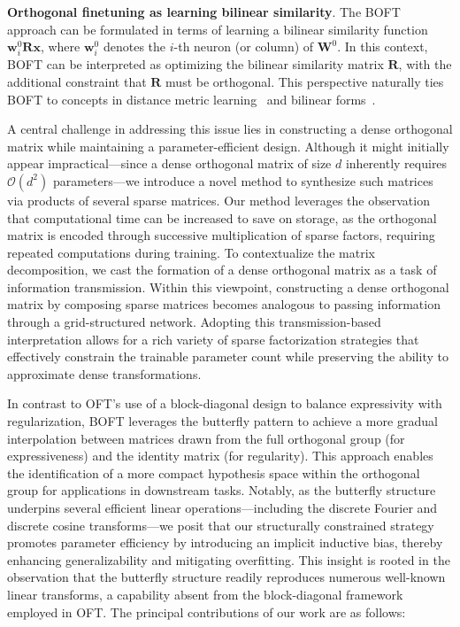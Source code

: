 \textbf{Orthogonal finetuning as learning bilinear similarity}. The BOFT approach can be formulated in terms of learning a bilinear similarity function $\bm{w}^0_i\bm{R}\bm{x}$, where $\bm{w}^0_i$ denotes the $i$-th neuron (or column) of $\bm{W}^0$. In this context, BOFT can be interpreted as optimizing the bilinear similarity matrix $\bm{R}$, with the additional constraint that $\bm{R}$ must be orthogonal. This perspective naturally ties BOFT to concepts in distance metric learning~\cite{xing2002distance} and bilinear forms~\cite{roman2005advanced}.



A central challenge in addressing this issue lies in constructing a dense orthogonal matrix while maintaining a parameter-efficient design. Although it might initially appear impractical—since a dense orthogonal matrix of size $d$ inherently requires $\mathcal{O}(d^2)$ parameters—we introduce a novel method to synthesize such matrices via products of several sparse matrices. Our method leverages the observation that computational time can be increased to save on storage, as the orthogonal matrix is encoded through successive multiplication of sparse factors, requiring repeated computations during training. To contextualize the matrix decomposition, we cast the formation of a dense orthogonal matrix as a task of information transmission. Within this viewpoint, constructing a dense orthogonal matrix by composing sparse matrices becomes analogous to passing information through a grid-structured network. Adopting this transmission-based interpretation allows for a rich variety of sparse factorization strategies that effectively constrain the trainable parameter count while preserving the ability to approximate dense transformations.

In contrast to OFT’s use of a block-diagonal design to balance expressivity with regularization, BOFT leverages the butterfly pattern to achieve a more gradual interpolation between matrices drawn from the full orthogonal group (for expressiveness) and the identity matrix (for regularity). This approach enables the identification of a more compact hypothesis space within the orthogonal group for applications in downstream tasks. Notably, as the butterfly structure underpins several efficient linear operations—including the discrete Fourier and discrete cosine transforms—we posit that our structurally constrained strategy promotes parameter efficiency by introducing an implicit inductive bias, thereby enhancing generalizability and mitigating overfitting. This insight is rooted in the observation that the butterfly structure readily reproduces numerous well-known linear transforms, a capability absent from the block-diagonal framework employed in OFT. The principal contributions of our work are as follows:

